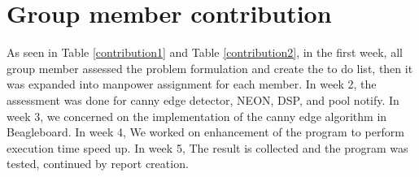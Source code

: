 \documentclass[conference]{IEEEtran}
\begin{document}
%











\section*{Group member contribution}
As seen in Table \ref{contribution1} and Table \ref{contribution2}, in the first week, all group member assessed the problem formulation and create the to do list, then it was expanded into manpower assignment for each member. In week 2, the assessment was done for canny edge detector, NEON, DSP, and pool notify. In week 3, we concerned on the implementation of the canny edge algorithm in Beagleboard. In week 4, We worked on enhancement of the program to perform execution time speed up. In week 5, The result is collected and the program was tested, continued by report creation.
%
%
\end{document}
